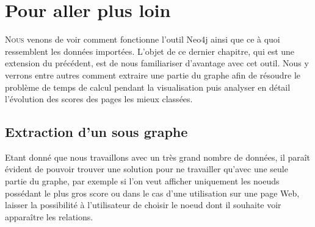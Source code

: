 \documentclass[12pt,twoside, openright]{memoir}
\begin{document}
	\chapter{Pour aller plus loin}
	\lettrine[lraise=0.1, nindent=0em]{N}{ous} venons de voir comment fonctionne l'outil Neo4j ainsi que ce à quoi ressemblent les données importées. L'objet de ce dernier chapitre, qui est une extension du précédent, est de nous familiariser d'avantage avec cet outil. Nous y verrons entre autres comment extraire une partie du graphe afin de résoudre le problème de temps de calcul pendant la visualisation puis analyser en détail l'évolution des scores des pages les mieux classées.
	\section{Extraction d'un sous graphe}
	Etant donné que nous travaillons avec un très grand nombre de données, il paraît évident de pouvoir trouver une solution pour ne travailler qu'avec une seule partie du graphe, par exemple si l'on veut afficher uniquement les noeuds possédant le plus gros score ou dans le cas d'une utilisation sur une page Web, laisser la possibilité à l'utilisateur de choisir le noeud dont il souhaite voir apparaître les relations.
\end{document}
